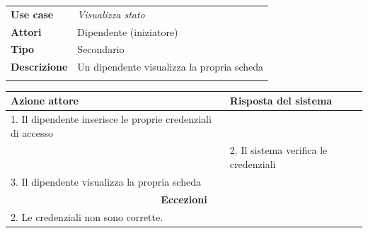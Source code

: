 \documentclass{scrreprt}
\begin{document}
		\FloatBarrier
	\begin{table}[h|]
	\centering
	\begin{tabular}{p{3cm}p{11cm}}
	\textbf{Use case} & \textit{Visualizza stato} \\ 
	\textbf{Attori} & Dipendente (iniziatore) \\ 
	\textbf{Tipo} & Secondario \\ 
	\textbf{Descrizione} & Un dipendente visualizza la propria scheda \\
	\\
	\end{tabular}
	\centering
	\begin{tabular}{|p{7cm}|p{7cm}|}
	\hline
	\textbf{Azione attore} & \textbf{Risposta del sistema} \\ \hline
	1. Il dipendente inserisce le proprie credenziali di accesso &                  \\ \hline
	 & 2. Il sistema verifica le credenziali \\ \hline
	3. Il dipendente visualizza la propria scheda & \\ \hline
	\multicolumn{2}{|c|}{\textbf{Eccezioni}} \\ \hline
	\multicolumn{2}{|l|}{ 2. Le credenziali non sono corrette. } \\ \hline
	\end{tabular}
	\end{table}
	\FloatBarrier
	
	
\end{document}
